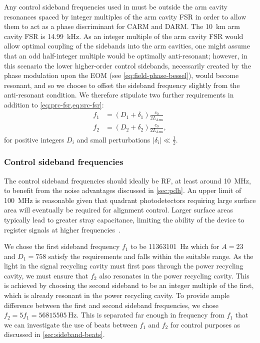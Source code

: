Any control sideband frequencies used in \ETLF{} must be outside the arm cavity resonances spaced by integer multiples of the arm cavity \gls{FSR} in order to allow them to act as a phase discriminant for \gls{CARM} and \gls{DARM}. The \SI{10}{\kilo\meter} arm cavity \gls{FSR} is \SI{14.99}{\kilo\hertz}. As an integer multiple of the arm cavity \gls{FSR} would allow optimal coupling of the sidebands into the arm cavities, one might assume that an odd half-integer multiple would be optimally anti-resonant; however, in this scenario the lower higher-order control sidebands, necessarily created by the phase modulation upon the \gls{EOM} (see \cref{eq:field-phase-bessel}), would become resonant, and so we choose to offset the sideband frequency slightly from the anti-resonant condition. We therefore stipulate two further requirements in addition to \cref{eq:prc-fsr,eq:src-fsr}:
\begin{align}
  \label{eq:arm-fsr}
  f_1 &= \left(D_{1} + \delta_{1} \right) \frac{c_0}{2 L_{\text{Arm}}} \\
  f_2 &= \left(D_{2} + \delta_{2} \right) \frac{c_0}{2 L_{\text{Arm}}},
\end{align}
for positive integers $D_{i}$ and small perturbations $\left| \delta_{i} \right| \ll \frac{1}{2}$.

\subsubsection{Control sideband frequencies}
The control sideband frequencies should ideally be \gls{RF}, at least around \SI{10}{\mega\hertz}, to benefit from the noise advantages discussed in \cref{sec:pdh}. An upper limit of \SI{100}{\mega\hertz} is reasonable given that quadrant photodetectors requiring large surface area will eventually be required for alignment control. Larger surface areas typically lead to greater stray capacitance, limiting the ability of the device to register signals at higher frequencies~\cite{Freise2010}.

We chose the first sideband frequency $f_1$ to be \SI{11363101}{\hertz} which for $A = 23$ and $D_{1} = 758$ satisfy the requirements and falls within the suitable range. As the light in the signal recycling cavity must first pass through the power recycling cavity, we must ensure that $f_2$ also resonates in the power recycling cavity. This is achieved by choosing the second sideband to be an integer multiple of the first, which is already resonant in the power recycling cavity. To provide ample difference between the first and second sideband frequencies, we chose $f_2 = 5f_1 = \SI{56815505}{\hertz}$. This is separated far enough in frequency from $f_1$ that we can investigate the use of beats between $f_1$ and $f_2$ for control purposes as discussed in \cref{sec:sideband-beats}.

